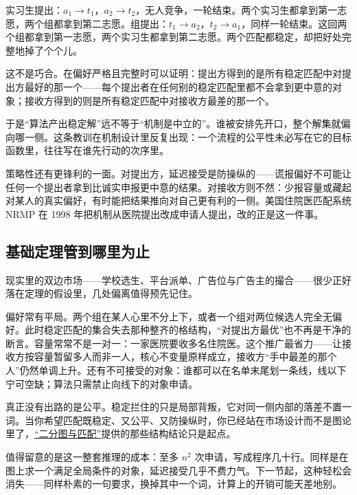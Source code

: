 实习生提出：\(a_1\to t_1\)，\(a_2\to t_2\)，无人竞争，一轮结束。两个实习生都拿到第一志愿，两个组都拿到第二志愿。组提出：\(t_1\to a_2\)，\(t_2\to a_1\)，同样一轮结束。这回两个组都拿到第一志愿，两个实习生都拿到第二志愿。两个匹配都稳定，却把好处完整地掉了个个儿。

这不是巧合。在偏好严格且完整时可以证明：提出方得到的是所有稳定匹配中对提出方最好的那一个——每个提出者在任何别的稳定匹配里都不会拿到更中意的对象；接收方得到的则是所有稳定匹配中对接收方最差的那一个。

于是``算法产出稳定解''远不等于``机制是中立的''。谁被安排先开口，整个解集就偏向哪一侧。这条教训在机制设计里反复出现：一个流程的公平性未必写在它的目标函数里，往往写在谁先行动的次序里。

策略性还有更锋利的一面。对提出方，延迟接受是防操纵的——谎报偏好不可能让任何一个提出者拿到比诚实申报更中意的结果。对接收方则不然：少报容量或藏起对某人的真实偏好，有时能把结果推向对自己更有利的一侧。美国住院医匹配系统 NRMP 在 1998 年把机制从医院提出改成申请人提出，改的正是这一件事。

\subsection{基础定理管到哪里为止}

现实里的双边市场——学校选生、平台派单、广告位与广告主的撮合——很少正好落在定理的假设里，几处偏离值得预先记住。

偏好常有平局。两个组在某人心里不分上下，或者一个组对两位候选人完全无偏好。此时稳定匹配的集合失去那种整齐的格结构，``对提出方最优''也不再是干净的断言。容量常常不是一对一：一家医院要收多名住院医。这个推广最省力——让接收方按容量暂留多人而非一人，核心不变量原样成立，接收方``手中最差的那个人''仍然单调上升。还有不可接受的对象：谁都可以在名单末尾划一条线，线以下宁可空缺；算法只需禁止向线下的对象申请。

真正没有出路的是公平。稳定拦住的只是局部背叛，它对同一侧内部的落差不置一词。当你希望匹配既稳定、又公平、又防操纵时，你已经站在市场设计而不是图论里了，\hyperref[sec:04-Discrete-Mathematics/03-Graph-Theory/04]{``二分图与匹配''}提供的那些结构结论只是起点。

值得留意的是这一整套推理的成本：至多 \(n^2\) 次申请，写成程序几十行。同样是在图上求一个满足全局条件的对象，延迟接受几乎不费力气。下一节起，这种轻松会消失——同样朴素的一句要求，换掉其中一个词，计算上的开销可能天差地别。
